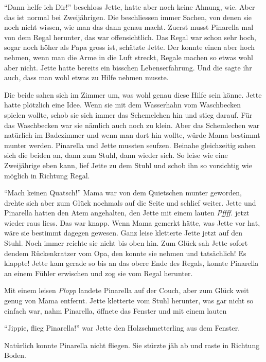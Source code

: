 \enquote{Dann helfe ich Dir!} beschloss Jette, hatte aber noch keine Ahnung, wie. Aber das ist normal bei Zweijährigen. Die beschliessen immer Sachen, von denen sie noch nicht wissen, wie man das dann genau macht. Zuerst musst Pinarella mal von dem Regal herunter, das war offensichtlich. Das Regal war schon sehr hoch, sogar noch höher als Papa gross ist, schätzte Jette. Der konnte einen aber hoch nehmen, wenn man die Arme in die Luft streckt, Regale machen so etwas wohl aber nicht. Jette hatte bereits ein bisschen Lebenserfahrung. Und die sagte ihr auch, dass man wohl etwas zu Hilfe nehmen musste.

Die beide sahen sich im Zimmer um, was wohl genau diese Hilfe sein könne. Jette hatte plötzlich eine Idee. Wenn sie mit dem Wasserhahn vom Waschbecken spielen wollte, schob sie sich immer das Schemelchen hin und stieg darauf. Für das Waschbecken war sie nämlich auch noch zu klein.  Aber das Schemlechen war natürlich im Badezimmer und wenn man dort hin wollte, würde Mama bestimmt munter werden. Pinarella und Jette mussten seufzen. Beinahe gleichzeitig sahen sich die beiden an, dann zum Stuhl, dann wieder sich. So leise wie eine Zweijährige eben kann, lief Jette zu dem Stuhl und schob ihn so vorsichtig wie möglich in Richtung Regal.

\enquote{Mach keinen Quatsch!} Mama war von dem Quietschen munter geworden, drehte sich aber zum Glück nochmals auf die Seite und schlief weiter. Jette und Pinarella hatten den Atem angehalten, den Jette mit einem lauten {\it Pffff.} jetzt wieder raus liess. Das war knapp. Wenn Mama gemerkt hätte, was Jette vor hat, wäre sie bestimmt dagegen gewesen. Ganz leise kletterte Jette jetzt auf den Stuhl. Noch immer reichte sie nicht bis oben hin. Zum Glück sah Jette sofort dendem Rückenkratzer vom Opa, den konnte sie nehmen und tatsächlich! Es klappte! Jette kam gerade so bis an das obere Ende des Regals, konnte Pinarella an einem Fühler erwischen und zog sie vom Regal herunter.

Mit einem leisen {\it Plopp} landete Pinarella auf der Couch, aber zum Glück weit genug von Mama entfernt. Jette kletterte vom Stuhl herunter, was gar nicht so einfach war, nahm Pinarella, öffnete das Fenster und mit einem lauten 

\enquote{Jippie, flieg Pinarella!} war Jette den Holzschmetterling aus dem Fenster.

Natürlich konnte Pinarella nicht fliegen. Sie stürzte jäh ab und raste in Richtung Boden. 

